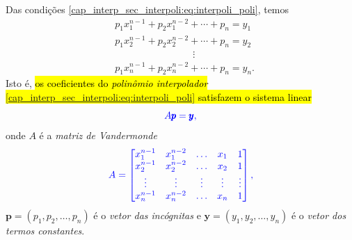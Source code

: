 Das condições \eqref{cap_interp_sec_interpoli:eq:interpoli_poli}, temos
\begin{equation}\label{cap_interp_sec_interpoli:eq:interpoli_sis}
  \begin{aligned}
    &p_1x_1^{n-1} + p_2x_1^{n-2} + \cdots + p_n = y_1 \\
    &p_1x_2^{n-1} + p_2x_2^{n-2} + \cdots + p_n = y_2 \\
    &\text{}\qquad\qquad\qquad\qquad\vdots \\
    &p_1x_n^{n-1} + p_2x_n^{n-2} + \cdots + p_n = y_n.
  \end{aligned}
\end{equation}
Isto é, \hl{os coeficientes do \emph{polinômio interpolador} {\eqref{cap_interp_sec_interpoli:eq:interpoli_poli}} satisfazem o sistema linear}
\begin{equation}\color{blue}A\pmb{p} = \pmb{y},
\end{equation}
onde $A$ é a \emph{matriz de Vandermonde}{\vandermonde}
\begin{equation}\color{blue}A =
  \begin{bmatrix}
    x_1^{n-1} & x_1^{n-2} & \ldots & x_1 & 1 \\
    x_2^{n-1} & x_2^{n-2} & \ldots & x_2 & 1 \\
    \vdots  & \vdots  & \vdots  & \vdots & \vdots \\
    x_n^{n-1} & x_n^{n-2} & \ldots & x_n & 1
  \end{bmatrix},
\end{equation}
$\pmb{p} = (p_1, p_2, \ldots, p_n)$ é o \emph{vetor das incógnitas} e $\pmb{y} = (y_1, y_2, \ldots, y_n)$ é o \emph{vetor dos termos constantes}.

